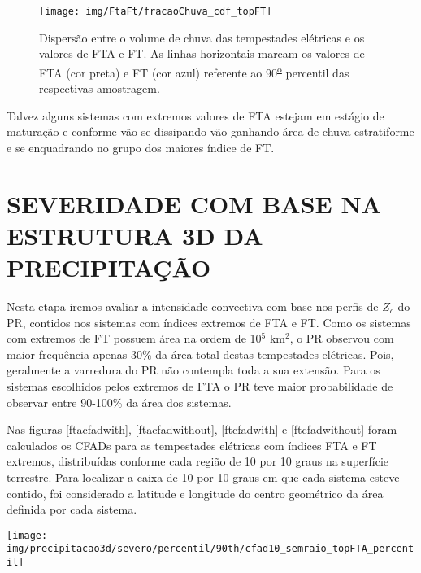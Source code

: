 \begin{figure}[!hb]
  \centering 
  \texttt{[image: img/FtaFt/fracaoChuva\_cdf\_topFT]}
  \caption{Dispersão entre o volume de chuva das tempestades elétricas e os valores de FTA e FT.  As linhas horizontais marcam os valores de FTA (cor preta) e FT (cor azul) referente ao 90\textsuperscript{\underline{o}} percentil das respectivas amostragem.}
  \label{cdffracaoFT}
\end{figure}









Talvez alguns sistemas com extremos valores de FTA estejam em estágio de maturação e conforme vão se dissipando vão ganhando área de chuva estratiforme e se enquadrando no grupo dos maiores índice de FT. 


\section{SEVERIDADE COM BASE NA ESTRUTURA 3D DA PRECIPITAÇÃO}

Nesta etapa iremos avaliar a intensidade convectiva com base nos perfis de $Z_c$ do PR, contidos nos sistemas com índices extremos de FTA e FT. Como os sistemas com extremos de FT possuem área na ordem de 10$^5$ km$^2$, o PR observou com maior frequência apenas  30\% da área total destas tempestades elétricas. Pois, geralmente a varredura do PR não contempla toda a sua extensão. Para os sistemas escolhidos pelos extremos de FTA o PR teve maior probabilidade de observar entre 90-100\% da área dos sistemas.

Nas figuras \ref{ftacfadwith}, \ref{ftacfadwithout}, \ref{ftcfadwith} e \ref{ftcfadwithout} foram calculados os CFADs para as tempestades elétricas com índices FTA e FT extremos, distribuídas conforme cada região de 10 por 10 graus na superfície terrestre. Para localizar a caixa de 10 por 10 graus em que cada sistema esteve contido, foi considerado a latitude e longitude do centro geométrico da área definida por cada sistema.

\begin{sidewaysfigure}%
\centering
\texttt{[image: img/precipitacao3d/severo/percentil/90th/cfad10\_semraio\_topFTA\_percentil]}
\caption{CFADs para os extremos de FTA. Porção da precipitação sem raios.}
\label{ftacfadwithout}
\end{sidewaysfigure} 


